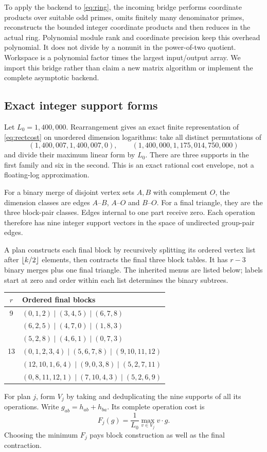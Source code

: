 \documentclass[11pt,letterpaper]{article}
\theoremstyle{remark}\newtheorem{remark}[theorem]{Remark}
\begin{document}
To apply the backend to \eqref{eq:ring}, the incoming bridge performs coordinate products over suitable odd primes, omits finitely many denominator primes, reconstructs the bounded integer coordinate products and then reduces in the actual ring. Polynomial module rank and coordinate precision keep this overhead polynomial. It does not divide by a nonunit in the power-of-two quotient. Workspace is a polynomial factor times the largest input/output array. We import this bridge rather than claim a new matrix algorithm or implement the complete asymptotic backend.

\subsection{Exact integer support forms}
Let $L_0=1{,}400{,}000$. Rearrangement gives an exact finite representation of \eqref{eq:rectcost} on unordered dimension logarithms: take all distinct permutations of
\begin{equation}\label{eq:supports}
 (1{,}400{,}007,1{,}400{,}007,0),\qquad
 (1{,}400{,}000,1{,}175{,}014,750{,}000)
\end{equation}
and divide their maximum linear form by $L_0$. There are three supports in the first family and six in the second. This is an exact rational cost envelope, not a floating-log approximation.

For a binary merge of disjoint vertex sets $A,B$ with complement $O$, the dimension classes are edges $A$--$B$, $A$--$O$ and $B$--$O$. For a final triangle, they are the three block-pair classes. Edges internal to one part receive zero. Each operation therefore has nine integer support vectors in the space of undirected group-pair edges.

A plan constructs each final block by recursively splitting its ordered vertex list after $\left\lfloor k/2\right\rfloor$ elements, then contracts the final three block tables. It has $r-3$ binary merges plus one final triangle. The inherited menus are listed below; labels start at zero and order within each list determines the binary subtrees.
\begin{center}\small
\begin{tabular}{@{}cl@{}}\toprule
$r$ & Ordered final blocks\\\midrule
9 & $(0,1,2)\mid(3,4,5)\mid(6,7,8)$\\
 & $(6,2,5)\mid(4,7,0)\mid(1,8,3)$\\
 & $(5,2,8)\mid(4,6,1)\mid(0,7,3)$\\[3pt]
13 & $(0,1,2,3,4)\mid(5,6,7,8)\mid(9,10,11,12)$\\
 & $(12,10,1,6,4)\mid(9,0,3,8)\mid(5,2,7,11)$\\
 & $(0,8,11,12,1)\mid(7,10,4,3)\mid(5,2,6,9)$\\\bottomrule
\end{tabular}
\end{center}
For plan $j$, form $V_j$ by taking and deduplicating the nine supports of all its operations. Write $g_{ab}=h_{ab}+h_{ba}$. Its complete operation cost is
\[
 F_j(g)=\frac1{L_0}\max_{v\in V_j}v\cdot g.
\]
Choosing the minimum $F_j$ pays block construction as well as the final contraction.
\end{document}
